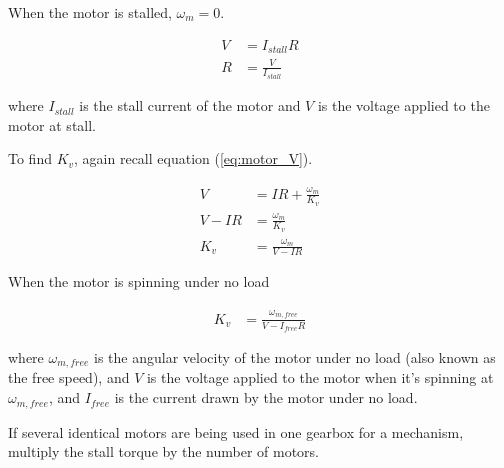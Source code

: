 When the motor is stalled, $\omega_m = 0$.

\begin{align}
  V &= I_{stall} R \nonumber \\
  R &= \frac{V}{I_{stall}}
\end{align}

where $I_{stall}$ is the stall current of the motor and $V$ is the voltage
applied to the motor at stall.

To find $K_v$, again recall equation (\ref{eq:motor_V}).

\begin{align*}
  V &= IR + \frac{\omega_m}{K_v} \\
  V - IR &= \frac{\omega_m}{K_v} \\
  K_v &= \frac{\omega_m}{V - IR}
\end{align*}

When the motor is spinning under no load

\begin{align}
  K_v &= \frac{\omega_{m,free}}{V - I_{free}R}
\end{align}

where $\omega_{m,free}$ is the angular velocity of the motor under no load (also
known as the free speed), and $V$ is the voltage applied to the motor when it's
spinning at $\omega_{m,free}$, and $I_{free}$ is the current drawn by the motor
under no load.

If several identical motors are being used in one gearbox for a mechanism,
multiply the stall torque by the number of motors.
